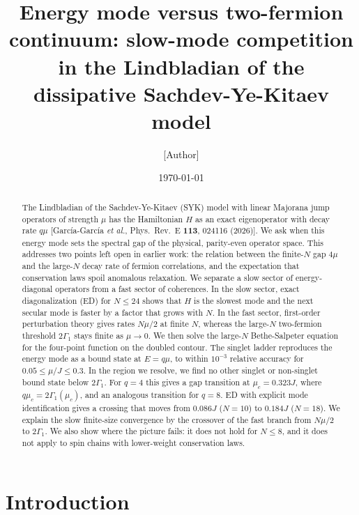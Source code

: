 \documentclass[aps,pre,twocolumn,superscriptaddress,amsmath,amssymb,10pt]{revtex4-2}
\begin{document}
\title{Energy mode versus two-fermion continuum: slow-mode competition in the Lindbladian of the dissipative Sachdev-Ye-Kitaev model}

\author{[Author]}
\affiliation{[Affiliation]}

\date{\today}

\begin{abstract}
The Lindbladian of the Sachdev-Ye-Kitaev (SYK) model with linear Majorana jump operators of strength $\mu$ has the Hamiltonian $H$ as an exact eigenoperator with decay rate $q\mu$ [Garc\'ia-Garc\'ia \emph{et al.}, Phys.\ Rev.\ E \textbf{113}, 024116 (2026)]. We ask when this energy mode sets the spectral gap of the physical, parity-even operator space. This addresses two points left open in earlier work: the relation between the finite-$N$ gap $4\mu$ and the large-$N$ decay rate of fermion correlations, and the expectation that conservation laws spoil anomalous relaxation. We separate a slow sector of energy-diagonal operators from a fast sector of coherences. In the slow sector, exact diagonalization (ED) for $N\le24$ shows that $H$ is the slowest mode and the next secular mode is faster by a factor that grows with $N$. In the fast sector, first-order perturbation theory gives rates $N\mu/2$ at finite $N$, whereas the large-$N$ two-fermion threshold $2\Gamma_1$ stays finite as $\mu\to0$. We then solve the large-$N$ Bethe-Salpeter equation for the four-point function on the doubled contour. The singlet ladder reproduces the energy mode as a bound state at $E=q\mu$, to within $10^{-3}$ relative accuracy for $0.05\le\mu/J\le0.3$. In the region we resolve, we find no other singlet or non-singlet bound state below $2\Gamma_1$. For $q=4$ this gives a gap transition at $\mu_c=0.323J$, where $q\mu_c=2\Gamma_1(\mu_c)$, and an analogous transition for $q=8$. ED with explicit mode identification gives a crossing that moves from $0.086J$ ($N=10$) to $0.184J$ ($N=18$). We explain the slow finite-size convergence by the crossover of the fast branch from $N\mu/2$ to $2\Gamma_1$. We also show where the picture fails: it does not hold for $N\le8$, and it does not apply to spin chains with lower-weight conservation laws.
\end{abstract}

\maketitle

\section{Introduction}
\end{document}
